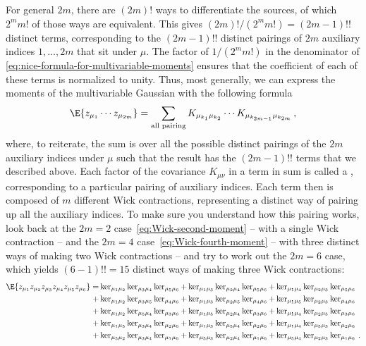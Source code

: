 For general $2m$, there are $(2m)!$ ways to differentiate the sources, of which $2^m m!$ of those ways are equivalent. This gives $(2m)!/(2^m m!) = (2m-1)!!$ distinct terms, corresponding to the $(2m-1)!!$ distinct pairings of $2m$ auxiliary indices $1,\ldots,2m$ that sit under $\mu$. The factor of $1/(2^m m!)$ in the denominator of \eqref{eq:nice-formula-for-multivariable-moments} ensures that the coefficient of each of these terms is normalized to unity.
Thus, most generally, we can express the moments of the multivariable Gaussian with the following formula
 \begin{align}\label{eq:Wick-multi}
\E{z_{\mu_1}\cdots z_{\mu_{2m}}}=\sum_{\text{all pairing}}K_{\mu_{k_1}\mu_{k_2}}\cdots K_{\mu_{k_{2m-1}}\mu_{k_{2m}}} \, ,
 \end{align}
where, to reiterate, the sum is over all the possible distinct pairings of the $2m$ auxiliary indices under $\mu$ such that the result has the $(2m-1)!!$ terms that we described above.
Each factor of the covariance $K_{\mu\nu}$ in a term in sum is called a , corresponding to a particular pairing of auxiliary indices. Each term then is composed of $m$ different Wick contractions, representing a distinct way of pairing up all the auxiliary indices.
To make sure you understand how this pairing works, look back at the $2m=2$ case~\eqref{eq:Wick-second-moment} -- with a single Wick contraction -- and the $2m=4$ case~\eqref{eq:Wick-fourth-moment} -- with three distinct ways of making two Wick contractions -- and try to work out the $2m=6$ case, which yields $(6-1)!!=15$ distinct ways of making three Wick contractions:
\begin{align}
\E{z_{\mu_1}z_{\mu_2}z_{\mu_{3}} z_{\mu_{4}}z_{\mu_5} z_{\mu_{6}}}=&\ker_{\mu_1 \mu_2}\ker_{\mu_3 \mu_4}\ker_{\mu_5 \mu_6}+\ker_{\mu_1 \mu_3}\ker_{\mu_2 \mu_4}\ker_{\mu_5 \mu_6}+\ker_{\mu_1 \mu_4}\ker_{\mu_2 \mu_3}\ker_{\mu_5 \mu_6}\, \nonumber\\
+&\ker_{\mu_1 \mu_2}\ker_{\mu_3 \mu_5}\ker_{\mu_4 \mu_6}+\ker_{\mu_1 \mu_3}\ker_{\mu_2 \mu_5}\ker_{\mu_4 \mu_6}+\ker_{\mu_1 \mu_5}\ker_{\mu_2 \mu_3}\ker_{\mu_4 \mu_6}\, \nonumber\\
+&\ker_{\mu_1 \mu_2}\ker_{\mu_5 \mu_4}\ker_{\mu_3 \mu_6}+\ker_{\mu_1 \mu_5}\ker_{\mu_2 \mu_4}\ker_{\mu_3 \mu_6}+\ker_{\mu_1 \mu_4}\ker_{\mu_2 \mu_5}\ker_{\mu_3 \mu_6}\, \nonumber\\
+&\ker_{\mu_1 \mu_5}\ker_{\mu_3 \mu_4}\ker_{\mu_2 \mu_6}+\ker_{\mu_1 \mu_3}\ker_{\mu_5 \mu_4}\ker_{\mu_2 \mu_6}+\ker_{\mu_1 \mu_4}\ker_{\mu_5 \mu_3}\ker_{\mu_2 \mu_6}\, \nonumber\\
+&\ker_{\mu_5 \mu_2}\ker_{\mu_3 \mu_4}\ker_{\mu_1 \mu_6}+\ker_{\mu_5 \mu_3}\ker_{\mu_2 \mu_4}\ker_{\mu_1 \mu_6}+\ker_{\mu_5 \mu_4}\ker_{\mu_2 \mu_3}\ker_{\mu_1 \mu_6}\, .\nonumber
\end{align}

